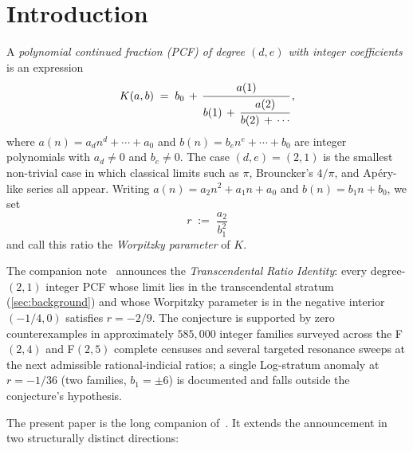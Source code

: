 \documentclass[11pt]{amsart}
\theoremstyle{definition}
\theoremstyle{remark}
\begin{document}
\maketitle

\section{Introduction}\label{sec:intro}

A \emph{polynomial continued fraction (PCF) of degree $(d,e)$ with
integer coefficients} is an expression
\begin{equation}\label{eq:pcf}
  K(a,b) \;=\; b_0 \,+\, \cfrac{a(1)}{b(1) \,+\, \cfrac{a(2)}{b(2)
  \,+\, \cdots}}\,,
\end{equation}
where $a(n) = a_d n^d + \cdots + a_0$ and $b(n) = b_e n^e + \cdots +
b_0$ are integer polynomials with $a_d \ne 0$ and $b_e \ne 0$.  The
case $(d,e) = (2,1)$ is the smallest non-trivial case in which
classical limits such as $\pi$, Brouncker's $4/\pi$, and Apéry-like
series all appear.  Writing $a(n) = a_2 n^2 + a_1 n + a_0$ and
$b(n) = b_1 n + b_0$, we set
\[
  r \;:=\; \frac{a_2}{b_1^2}
\]
and call this ratio the \emph{Worpitzky parameter} of $K$.

The companion note~\cite{TRINote} announces the \emph{Transcendental
Ratio Identity}: every degree-$(2,1)$ integer PCF whose limit lies in
the transcendental stratum (\textsection\ref{sec:background}) and
whose Worpitzky parameter is in the negative interior $(-1/4,0)$
satisfies $r=-2/9$.  The conjecture is supported by zero
counterexamples in approximately $585{,}000$ integer families surveyed
across the F$(2,4)$ and F$(2,5)$ complete censuses and several
targeted resonance sweeps at the next admissible rational-indicial
ratios; a single Log-stratum anomaly at $r=-1/36$ (two families,
$b_1=\pm 6$) is documented and falls outside the conjecture's hypothesis.

The present paper is the long companion of~\cite{TRINote}.  It
extends the announcement in two structurally distinct directions:
\end{document}

